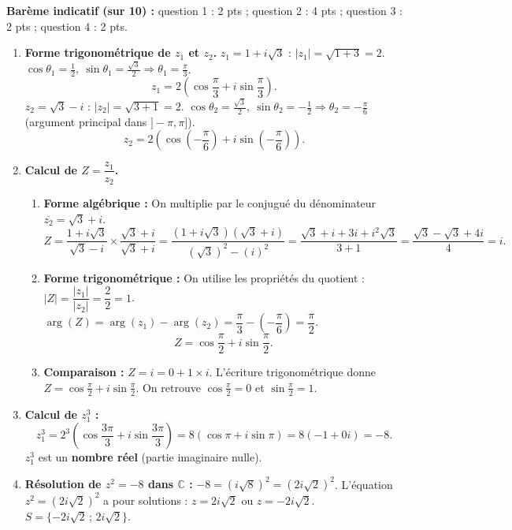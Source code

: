 \documentclass[11pt]{article}
\begin{document}
\begin{corrige}
\textbf{Barème indicatif (sur 10) :} question 1 : 2 pts ; question 2 : 4 pts ; question 3 : 2 pts ; question 4 : 2 pts.

\begin{enumerate}
\item \textbf{Forme trigonométrique de $z_1$ et $z_2$.}
$z_1 = 1 + i\sqrt{3}$ : $|z_1| = \sqrt{1 + 3} = 2$. $\cos\theta_1 = \frac{1}{2},\ \sin\theta_1 = \frac{\sqrt{3}}{2} \Rightarrow \theta_1 = \frac{\pi}{3}$.
\[ z_1 = 2\left(\cos\dfrac{\pi}{3} + i\sin\dfrac{\pi}{3}\right). \]
$z_2 = \sqrt{3} - i$ : $|z_2| = \sqrt{3 + 1} = 2$. $\cos\theta_2 = \frac{\sqrt{3}}{2},\ \sin\theta_2 = -\frac{1}{2} \Rightarrow \theta_2 = -\frac{\pi}{6}$ (argument principal dans $]-\pi,\pi]$).
\[ z_2 = 2\left(\cos\left(-\dfrac{\pi}{6}\right) + i\sin\left(-\dfrac{\pi}{6}\right)\right). \]

\item \textbf{Calcul de $Z = \dfrac{z_1}{z_2}$.}
\begin{enumerate}
\item \textbf{Forme algébrique :} On multiplie par le conjugué du dénominateur $\overline{z_2} = \sqrt{3} + i$.
\[ Z = \dfrac{1 + i\sqrt{3}}{\sqrt{3} - i} \times \dfrac{\sqrt{3} + i}{\sqrt{3} + i} = \dfrac{(1+i\sqrt{3})(\sqrt{3}+i)}{(\sqrt{3})^2 - (i)^2} = \dfrac{\sqrt{3} + i + 3i + i^2\sqrt{3}}{3 + 1} = \dfrac{\sqrt{3} - \sqrt{3} + 4i}{4} = i. \]
\item \textbf{Forme trigonométrique :} On utilise les propriétés du quotient :
$|Z| = \dfrac{|z_1|}{|z_2|} = \dfrac{2}{2} = 1$.
$\arg(Z) = \arg(z_1) - \arg(z_2) = \dfrac{\pi}{3} - \left(-\dfrac{\pi}{6}\right) = \dfrac{\pi}{2}$.
\[ Z = \cos\dfrac{\pi}{2} + i\sin\dfrac{\pi}{2}. \]
\item \textbf{Comparaison :} $Z = i = 0 + 1 \times i$. L'écriture trigonométrique donne $Z = \cos\frac{\pi}{2} + i\sin\frac{\pi}{2}$. On retrouve $\cos\frac{\pi}{2} = 0$ et $\sin\frac{\pi}{2} = 1$.
\end{enumerate}

\item \textbf{Calcul de $z_1^3$ :}
\[ z_1^3 = 2^3\left(\cos\dfrac{3\pi}{3} + i\sin\dfrac{3\pi}{3}\right) = 8(\cos\pi + i\sin\pi) = 8(-1 + 0i) = -8. \]
$z_1^3$ est un \textbf{nombre réel} (partie imaginaire nulle).

\item \textbf{Résolution de $z^2 = -8$ dans $\mathbb{C}$ :}
$-8 = (i\sqrt{8})^2 = (2i\sqrt{2})^2$. L'équation $z^2 = (2i\sqrt{2})^2$ a pour solutions :
$z = 2i\sqrt{2}$ ou $z = -2i\sqrt{2}$.
$S = \{-2i\sqrt{2}\,;\, 2i\sqrt{2}\}$.
\end{enumerate}


\end{corrige}
\end{document}
